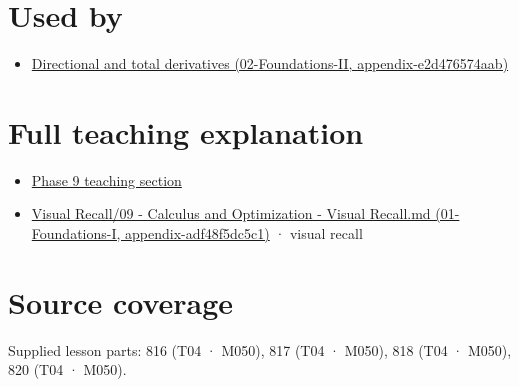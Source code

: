 \section{Used by}\label{appendix-677b59746ae0-used-by}

\begin{itemize}
\tightlist
\item
  \href{../02-Foundations-II/main.pdf\#nameddest=appendix-e2d476574aab}{Directional and total derivatives (02-Foundations-II, appendix-e2d476574aab)}
\end{itemize}

\section{Full teaching explanation}\label{appendix-677b59746ae0-full-teaching-explanation}

\begin{itemize}
\tightlist
\item
  \href{Continuous\%20Notes/Computing\%20Foundations\%20-\%20From\%20Bits\%20to\%20C++\%20and\%20Systems\%20APIs\#Multivariable\%20derivatives\%20and\%20sensitivity}{Phase 9 teaching section}
\item
  \href{../01-Foundations-I/main.pdf\#nameddest=appendix-adf48f5dc5c1}{Visual Recall/09 - Calculus and Optimization - Visual Recall.md (01-Foundations-I, appendix-adf48f5dc5c1)} · visual recall
\end{itemize}

\section{Source coverage}\label{appendix-677b59746ae0-source-coverage}

Supplied lesson parts: 816 (T04 · M050), 817 (T04 · M050), 818 (T04 · M050), 820 (T04 · M050).
